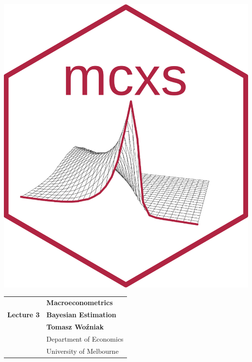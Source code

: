 \documentclass[notes,blackandwhite,mathsans]{beamer}
\begin{document}





\begin{frame}
\centering\includegraphics[scale=1.87]{mcxs.png}
\end{frame}





{
\begin{frame}

\vspace{1cm}
\begin{tabular}{rl}
&\textbf{\LARGE\color{mcxs2} Macroeconometrics}\\[8ex]
\textbf{\Large\color{mcxs2} Lecture 3}&\textbf{\Large\color{mcxs3}Bayesian Estimation}\\[19ex]
&\textbf{\color{mcxs2} Tomasz Wo\'zniak}\\[1ex]
&{\small\color{mcxs3} Department of Economics}\\
&{\small\color{mcxs3}University of Melbourne}
\end{tabular}

\end{frame}
}
\end{document}
